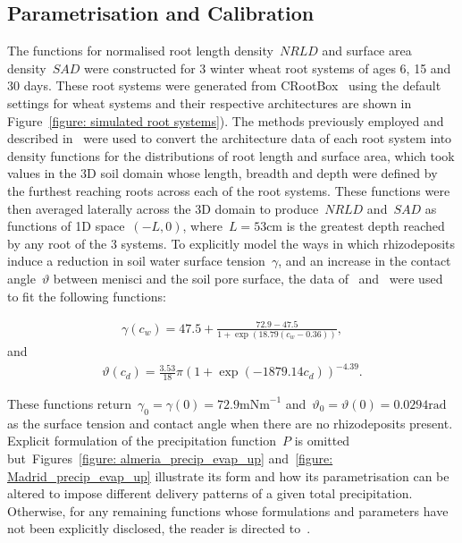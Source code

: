 \documentclass[11pt,a4paper]{article}
\numberwithin{equation}{section}
\begin{document}
\subsection{Parametrisation and Calibration}\label{subsec: parametrisation and calibration}  	      
The functions for normalised root length density~$NRLD$ and surface area density~$SAD$ were constructed for 3 winter wheat root systems of ages 6, 15 and 30 days. These root systems were generated from CRootBox~\citep{schnepf2018crootbox} using the default settings for wheat systems and their respective architectures are shown in Figure~\ref{figure: simulated root systems}). The methods previously employed and described in~\citep{mair2022model, mair2023can} were used to convert the architecture data of each root system into density functions for the distributions of root length and surface area, which took values in the 3D soil domain whose length, breadth and depth were defined by the furthest reaching roots across each of the root systems. These functions were then averaged laterally across the 3D domain to produce~$NRLD$ and~$SAD$ as functions of 1D space~$(-L,0)$, where~$L = 53\text{cm}$ is the greatest depth reached by any root of the 3 systems. 
To explicitly model the ways in which rhizodeposits induce a reduction in soil water surface tension~$\gamma$, and an increase in the contact angle~$\vartheta$ between menisci and the soil pore surface, the data of~\cite{read2003plant} and~\cite{zickenrott2016efficient} were used to fit the following functions:
\begin{linenomath*}
	\begin{equation}\label{model: surface tension}
		\begin{aligned}
			\gamma(c_w) = 47.5 +\frac{72.9-47.5}{1 + \exp(18.79(c_w-0.36))},
		\end{aligned}
	\end{equation}
	and
	\begin{equation}\label{model: contact angle}
		\begin{aligned}
			\vartheta(c_d) = \frac{3.53}{18}\pi(1+\exp(-1879.14c_d))^{-4.39}.
		\end{aligned}
	\end{equation}
\end{linenomath*}
These functions return~$\gamma_0=\gamma(0)=72.9\text{mNm}^{-1}$ and~$\vartheta_0 = \vartheta(0) = 0.0294\text{rad}$ as the surface tension and contact angle when there are no rhizodeposits present. Explicit formulation of the precipitation function~$P$ is omitted but~Figures~\ref{figure: almeria_precip_evap_up} and~\ref{figure: Madrid_precip_evap_up} illustrate its form and how its parametrisation can be altered to impose different delivery patterns of a given total precipitation. Otherwise, for any remaining functions whose formulations and parameters have not been explicitly disclosed, the reader is directed to~\citep{mair2023can}.   
\end{document}
